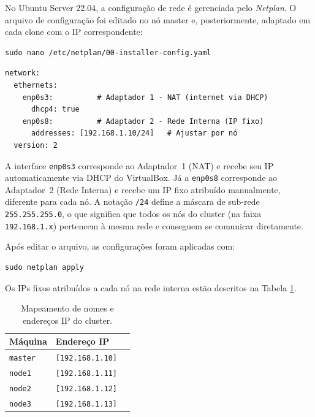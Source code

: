 \documentclass[
	12pt,
	oneside,
	a4paper,
	chapter=TITLE,
	section=TITLE,
	english,
	brazil,
	sumario=tradicional
]{abntex2}
\begin{document}
No Ubuntu Server 22.04, a configuração de rede é gerenciada pelo
\textit{Netplan}. O arquivo de configuração foi editado no nó
master e, posteriormente, adaptado em cada clone com o IP
correspondente:
 
\begin{lstlisting}[style=bash, caption={Edição do arquivo de configuração do Netplan no master.}]
sudo nano /etc/netplan/00-installer-config.yaml
\end{lstlisting}
 
\begin{lstlisting}[style=bash, caption={Conteúdo do arquivo Netplan configurando NAT (DHCP) e IP fixo na rede interna.}]
network:
  ethernets:
    enp0s3:          # Adaptador 1 - NAT (internet via DHCP)
      dhcp4: true
    enp0s8:          # Adaptador 2 - Rede Interna (IP fixo)
      addresses: [192.168.1.10/24]   # Ajustar por nó
  version: 2
\end{lstlisting}
 
A interface \texttt{enp0s3} corresponde ao Adaptador~1 (NAT) e
recebe seu IP automaticamente via DHCP do VirtualBox. Já a
\texttt{enp0s8} corresponde ao Adaptador~2 (Rede Interna) e
recebe um IP fixo atribuído manualmente, diferente para cada nó.
A notação \texttt{/24} define a máscara de sub-rede
\texttt{255.255.255.0}, o que significa que todos os nós do
cluster (na faixa \texttt{192.168.1.x}) pertencem à mesma rede
e conseguem se comunicar diretamente.
 
Após editar o arquivo, as configurações foram aplicadas com:
 
\begin{lstlisting}[style=bash, caption={Aplicação das configurações de rede.}]
sudo netplan apply
\end{lstlisting}
 
Os IPs fixos atribuídos a cada nó na rede interna estão
descritos na Tabela \ref{tab:mapeamento}.

\begin{table}[htb]
    \centering
   
    \begin{tabular}{|l|l|l|}
        \hline

        \rowcolor{gray!25} 
        \textbf{Máquina}  & \textbf{Endereço IP}  \\ 
        \hline
        
        \texttt{master}   & \texttt{[192.168.1.10]} \\
        \hline
        \texttt{node1}    & \texttt{[192.168.1.11]} \\
        \hline
        \texttt{node2}    & \texttt{[192.168.1.12]} \\
        \hline
        \texttt{node3}    & \texttt{[192.168.1.13]} \\
        \hline
    \end{tabular}
    \caption{Mapeamento de nomes e endereços IP do cluster.}
    \label{tab:mapeamento}
\end{table}
 
\end{document}
